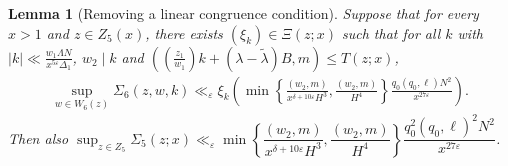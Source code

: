 \documentclass{amsart}
\newtheorem{lemma}{Lemma}
\numberwithin{equation}{section}
\begin{document}
\begin{lemma}[Removing a linear congruence condition]
\vspace{3mm} Suppose that for every $x>1$ and $z \in Z_5(x)$, there exists $(\xi_k) \in \Xi(z;x)$ such that for all $k$ with   $|k| \ll  \frac{w_1\Lambda N}{x^{5\varepsilon}\Delta_1}$,  
 $w_2 \mid k$  and $((\frac{z_1}{w_1})k+(\lambda-\widetilde{\lambda})B,m) \leq T(z;x)$, 
\begin{align*}
\sup_{w \in W_6(z)} \Sigma_6(z,w,k)  \ll_\varepsilon \xi_k  \left(\min\left\{\frac{(w_2,m)}{x^{\delta+10\varepsilon}H^3},\frac{(w_2,m)}{H^4}\right\}\frac{q_0(q_0,\ell)  N^2}{ x^{27\varepsilon}} \right).
\end{align*}
Then   also  $\sup_{z \in Z_5}\Sigma_5(z;x) \ll_\varepsilon  \min\left\{\dfrac{(w_2,m)}{x^{\delta+10\varepsilon}H^3}, \dfrac{ (w_2,m)}{H^4}\right\}\dfrac{q_0^2(q_0,\ell)^2 N^2 }{x^{27\varepsilon}} $.
\end{lemma}
\end{document}
